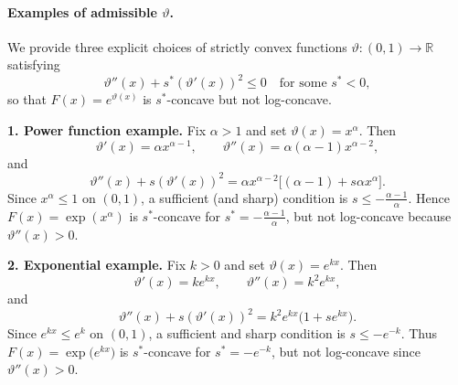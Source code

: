 \documentclass{article} %
\begin{document}
\paragraph{Examples of admissible \(\vartheta\).}

We provide three explicit choices of strictly convex functions 
$\vartheta : (0,1)\to\mathbb{R}$ satisfying
\[
\vartheta''(x) + s^* (\vartheta'(x))^2 \le 0
\quad\text{for some } s^*<0,
\]
so that $F(x)=e^{\vartheta(x)}$ is $s^*$-concave but not log-concave.

\medskip

\noindent\textbf{1. Power function example.}
Fix $\alpha>1$ and set $\vartheta(x) = x^\alpha$. Then
\[
\vartheta'(x)=\alpha x^{\alpha-1},
\qquad
\vartheta''(x)=\alpha(\alpha-1)x^{\alpha-2},
\]
and
\[
\vartheta''(x) + s (\vartheta'(x))^2
= \alpha x^{\alpha-2} \Big[ (\alpha-1) + s \alpha x^\alpha \Big].
\]
Since \(x^\alpha\le 1\) on \((0,1)\), a sufficient (and sharp) condition is $s \le -\frac{\alpha-1}{\alpha}$. Hence $F(x)=\exp(x^\alpha)$ is $s^*$-concave for 
$s^* = -\tfrac{\alpha-1}{\alpha}$, but not log-concave because \(\vartheta''(x)>0\).

\medskip

\noindent\textbf{2. Exponential example.}
Fix $k>0$ and set $\vartheta(x) = e^{kx}$.
Then
\[
\vartheta'(x)= k e^{kx},
\qquad 
\vartheta''(x)= k^2 e^{kx},
\]
and
\[
\vartheta''(x) + s(\vartheta'(x))^2
= k^2 e^{kx} \big( 1 + s e^{kx} \big).
\]
Since $e^{kx}\le e^k$ on $(0,1)$, a sufficient and sharp condition is $s \le - e^{-k}$. Thus $F(x)=\exp\!\big(e^{kx}\big)$ is $s^*$-concave for $s^* = -e^{-k}$, but not log-concave since $\vartheta''(x)>0$.
\end{document}
